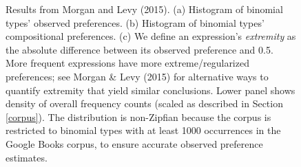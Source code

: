 \documentclass{evolang11}
\begin{document}
\begin{figure}[t]
\begin{center}
{	}

\end{center}
\caption{\footnotesize Results from Morgan and Levy (2015).  (a) Histogram of binomial types' observed preferences. (b) Histogram of binomial types' compositional preferences. (c) We define an expression's \emph{extremity} as the absolute difference between its observed preference and 0.5. More frequent expressions have more extreme/regularized preferences; see Morgan \& Levy (2015) for alternative ways to quantify extremity that yield similar conclusions. Lower panel shows density of overall frequency counts (scaled as described in Section \ref{corpus}). The distribution is non-Zipfian because the corpus is restricted to binomial types with at least 1000 occurrences in the Google Books corpus, to ensure accurate observed preference estimates.}
\end{figure}
\end{document}

